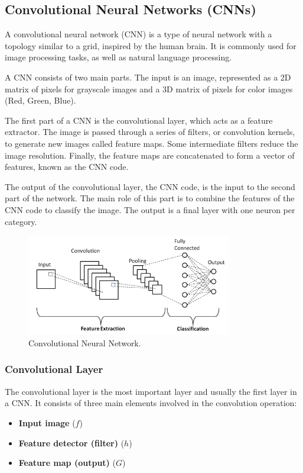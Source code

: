 \subsection{Convolutional Neural Networks (CNNs)}
\label{sec:cnn}
A convolutional neural network (CNN) is a type of neural network with a topology similar to a grid, inspired by the human brain. It is commonly used for image processing tasks, as well as natural language processing.

A CNN consists of two main parts. The input is an image, represented as a 2D matrix of pixels for grayscale images and a 3D matrix of pixels for color images (Red, Green, Blue).

The first part of a CNN is the convolutional layer, which acts as a feature extractor. The image is passed through a series of filters, or convolution kernels, to generate new images called feature maps. Some intermediate filters reduce the image resolution. Finally, the feature maps are concatenated to form a vector of features, known as the CNN code.

The output of the convolutional layer, the CNN code, is the input to the second part of the network. The main role of this part is to combine the features of the CNN code to classify the image. The output is a final layer with one neuron per category.
\begin{figure}[H]
  \centering
  \includegraphics[width=0.8\textwidth]{Images/Chapter1/cnn.png}
  \caption{Convolutional Neural Network.}
  \label{fig:cnn}
\end{figure}

\subsubsection{Convolutional Layer}
\label{sec:conv}

The convolutional layer is the most important layer and usually the first layer in a CNN. It consists of three main elements involved in the convolution operation:
\begin{itemize}
  \item \textbf{Input image} ($f$)
  \item \textbf{Feature detector (filter)} ($h$)
  \item \textbf{Feature map (output)} ($G$)
\end{itemize}

